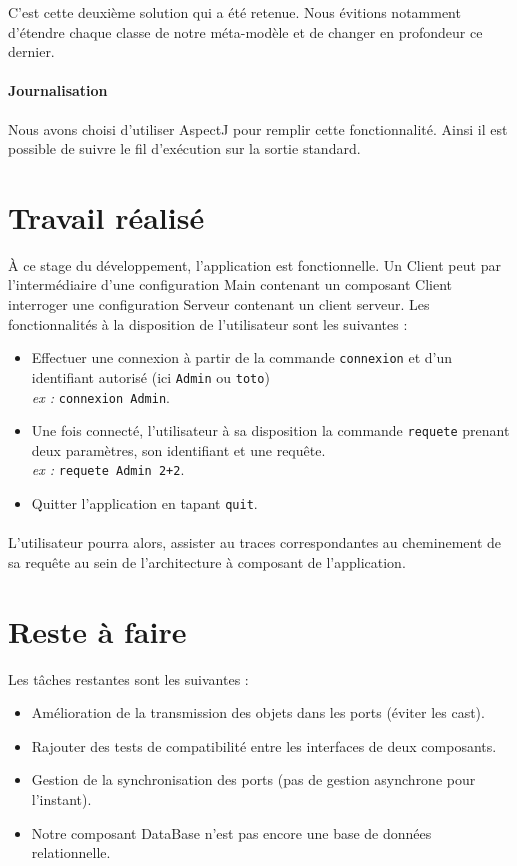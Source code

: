 \documentclass[11pt]{article}
\begin{document}
C'est cette deuxième solution qui a été retenue. Nous évitions notamment d'étendre chaque classe de notre méta-modèle et de changer en profondeur ce dernier.

\paragraph{Journalisation}
Nous avons choisi d'utiliser AspectJ pour remplir cette fonctionnalité.  Ainsi il est possible de suivre le fil d'exécution sur la sortie standard.

\section{Travail réalisé}
À ce stage du développement, l'application est fonctionnelle. Un Client peut par l'intermédiaire d'une configuration \og Main \fg{} contenant un composant Client interroger une configuration Serveur contenant un client serveur. Les fonctionnalités à la disposition de l'utilisateur sont les suivantes :
\begin{itemize}
\item
  Effectuer une connexion à partir de la commande \verb+connexion+ et d'un identifiant autorisé (ici \verb+Admin+ ou \verb+toto+)\hfill \\
  \emph{ex :} \verb-connexion Admin-.
\item
  Une fois connecté, l'utilisateur à sa disposition la commande \verb+requete+ prenant deux paramètres, son identifiant et une requête.  \hfill \\ 
  \emph{ex : }\verb-requete Admin 2+2-.
\item
  Quitter l'application en tapant \verb+quit+.
\end{itemize}
\paragraph{}

L'utilisateur pourra alors, assister au traces correspondantes au cheminement de sa requête au sein de l'architecture à composant de l'application.


\section{Reste à faire}
Les tâches restantes sont les suivantes : 

\begin{itemize}
\item
  Amélioration de la transmission des objets dans les ports (éviter les cast).
\item
  Rajouter des tests de compatibilité entre les interfaces de deux composants.
  
\item
  Gestion de la synchronisation des ports (pas de gestion asynchrone pour l'instant).
\item
  Notre composant DataBase n'est pas encore une base de données relationnelle.  
  \end{itemize}
\end{document}

